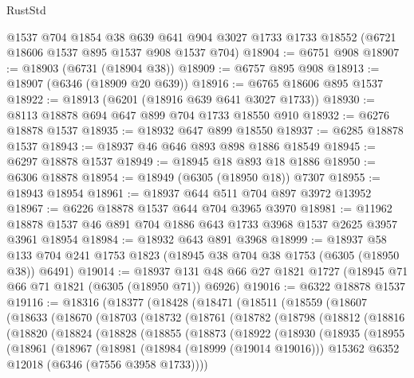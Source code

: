 \begin{lexlean}{RustStd}
\begin{coremodule}
    @1537
    @704
    @1854
    @38
    @639
    @641
    @904
    @3027
    @1733
    @1733
    @18552
    (@6721 @18606 @1537 @895 @1537 @908 @1537 @704)
@18904 := @6751 @908
@18907 := @18903 (@6731 (@18904 @38))
@18909 := @6757 @895 @908
@18913 := @18907 (@6346 (@18909 @20 @639))
@18916 := @6765 @18606 @895 @1537
@18922 := @18913 (@6201 (@18916 @639 @641 @3027 @1733))
@18930 := @8113 @18878 @694 @647 @899 @704 @1733 @18550 @910
@18932 := @6276 @18878 @1537
@18935 := @18932 @647 @899 @18550
@18937 := @6285 @18878 @1537
@18943 := @18937 @46 @646 @893 @898 @1886 @18549
@18945 := @6297 @18878 @1537
@18949 := @18945 @18 @893 @18 @1886
@18950 := @6306 @18878
@18954 := @18949 (@6305 (@18950 @18)) @7307
@18955 := @18943 @18954
@18961 := @18937 @644 @511 @704 @897 @3972 @13952
@18967 := @6226 @18878 @1537 @644 @704 @3965 @3970
@18981 := @11962 @18878 @1537 @46 @891 @704 @1886 @643 @1733 @3968 @1537 @2625 @3957 @3961 @18954
@18984 := @18932 @643 @891 @3968
@18999 := @18937
    @58
    @133
    @704
    @241
    @1753
    @1823
    (@18945 @38 @704 @38 @1753 (@6305 (@18950 @38)) @6491)
@19014 := @18937 @131 @48 @66 @27 @1821 @1727 (@18945 @71 @66 @71 @1821 (@6305 (@18950 @71)) @6926)
@19016 := @6322 @18878 @1537
@19116 := @18316
    (@18377
      (@18428
        (@18471
          (@18511
            (@18559
              (@18607
                (@18633
                  (@18670
                    (@18703
                      (@18732
                        (@18761
                          (@18782
                            (@18798
                              (@18812
                                (@18816
                                  (@18820
                                    (@18824
                                      (@18828
                                        (@18855
                                          (@18873
                                            (@18922
                                              (@18930
                                                (@18935
                                                  (@18955
                                                    (@18961
                                                      (@18967
                                                        (@18981
                                                          (@18984 (@18999 (@19014 @19016)))
                                                          @15362
                                                          @6352
                                                          @12018
                                                          (@6346 (@7556 @3958 @1733))))

\end{coremodule}
\end{lexlean}
